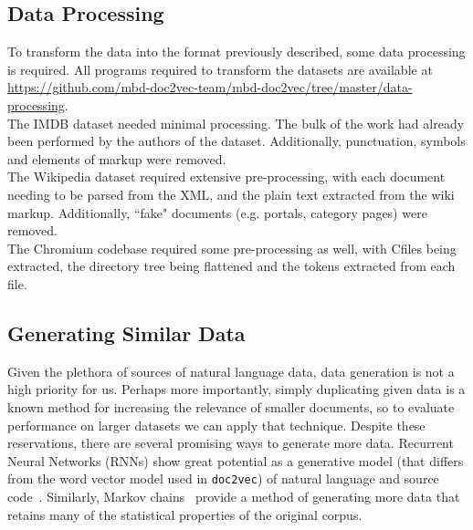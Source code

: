 \documentclass[11pt]{article}
\newcommand{\CPP}
{C\nolinebreak[4]\hspace{-.05em}\raisebox{.22ex}{\footnotesize\bf ++\ }}
\begin{document}
\subsection*{Data Processing}
  To transform the data into the format previously described, some data processing
  is required. All programs required to transform the datasets are available at
  \url{https://github.com/mbd-doc2vec-team/mbd-doc2vec/tree/master/data-processing}.\\
  The IMDB dataset needed minimal processing. The bulk of the work had already been
  performed by the authors of the dataset. Additionally, punctuation, symbols and
  elements of markup were removed.\\
  The Wikipedia dataset required extensive pre-processing, with each document
  needing to be parsed from the XML, and the plain text extracted from the wiki markup.
  Additionally, ``fake" documents (e.g. portals, category pages) were removed.\\
  The Chromium codebase required some pre-processing as well, with \CPP files being
  extracted, the directory tree being flattened and the tokens extracted from each file.
\subsection*{Generating Similar Data}
  Given the plethora of sources of natural language data, data generation is not a high
  priority for us. Perhaps more importantly, simply duplicating given data is a known
  method for increasing the relevance of smaller documents, so to evaluate performance
  on larger datasets we can apply that technique. Despite these reservations, there are
  several promising ways to generate more data. Recurrent Neural Networks (RNNs) show
  great potential as a generative model (that differs from the word vector model used
  in \texttt{doc2vec}) of natural language and source code~\cite{rnn2015}. Similarly,
  Markov chains~\cite{shannon2001mathematical} provide a method of generating more data
  that retains many of the statistical properties of the original corpus.

\newpage
\printbibliography
\end{document}
